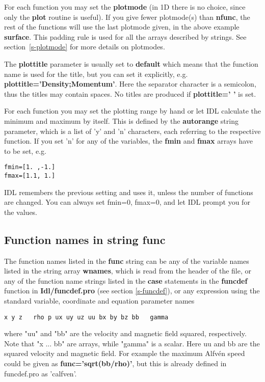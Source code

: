    For each function you may set the {\bf plotmode} (in 1D there is no
   choice, since only the {\bf plot} routine is useful). 
   If you give fewer plotmode(s) than {\bf nfunc}, the rest of
   the functions will use the last plotmode given, in the above example
   {\bf surface}. This padding rule is used for all the arrays described 
   by strings. See section~\ref{s-plotmode} for more details on plotmodes.

   The {\bf plottitle} parameter is usually set to {\bf default} which
   means that the function name is used for the title, but you can set it
   explicitly, e.g. {\bf plottitle='Density;Momentum'}. Here the 
   separator character is a semicolon, thus the titles may contain spaces.
   No titles are produced if {\bf plottitle=' '} is set.

   For each function you may set the plotting range by hand or let IDL
   calculate the minimum and maximum by itself. This is defined by
   the {\bf autorange} string parameter, which is a list of 'y' and 'n'
   characters, each referring to the respective function. If you set 'n'
   for any of the variables, the {\bf fmin} and {\bf fmax} arrays have
   to be set, e.g.
\begin{verbatim}
fmin=[1. ,-1.]
fmax=[1.1, 1.]
\end{verbatim}
   IDL remembers the previous setting and uses it, unless the number
   of functions are changed. You can always set fmin=0, fmax=0, and let
   IDL prompt you for the values.

\subsection{Function names in string func \label{s-functions}}

   The function names listed in the {\bf func} string can be any of 
   the variable names listed in the string array {\bf wnames}, which is 
   read from the header of the file, or any of the function name strings 
   listed in the {\bf case} statements in the {\bf funcdef} 
   function in {\bf Idl/funcdef.pro} (see section \ref{s-funcdef}), 
   or any expression using the standard variable, 
   coordinate and equation parameter names 
\begin{verbatim}
x y z   rho p ux uy uz uu bx by bz bb   gamma
\end{verbatim}
   where "uu" and "bb" are the velocity and magnetic field squared, 
   respectively. Note that "x ... bb" are arrays, while  "gamma" is
   a scalar. Here uu and bb are the squared velocity and magnetic field.
   For example the maximum Alfv\'en 
   speed could be given as {\bf func='sqrt(bb/rho)'}, but this is already 
   defined in funcdef.pro as 'calfven'. 

